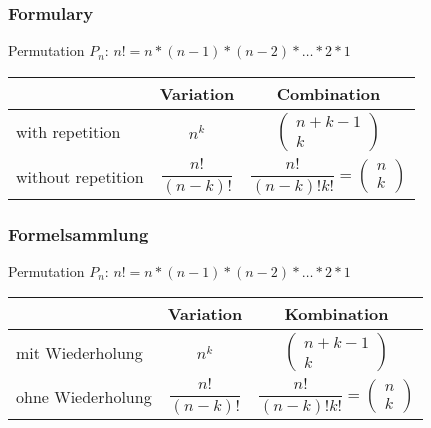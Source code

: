 \documentclass[xcolor=dvipsnames,11pt]{beamer}   %
\begin{document}
\begin{frame}
\frametitle{Formulary}
		Permutation $P_n$: $n! = n*(n-1)*(n-2)*\ldots*2*1$
\vspace*{0.3cm} 

\begin{tabular}{|l||c|c|} \hline
										  & Variation 				   & Combination \\
											\hline\hline
	with repetition     & $n^k$                & $\left(\begin{matrix} n+k-1 \\ k \end{matrix}\right)$ \\ \hline	
	without  repetition & $\dfrac{n!}{(n-k)!}$ & $\dfrac{n!}{(n-k)!k!}=\left(\begin{matrix} n \\ k \end{matrix}\right)$ \\ \hline
\end{tabular}
\end{frame} 

\begin{frame}
\frametitle{Formelsammlung}
		Permutation $P_n$: $n! = n*(n-1)*(n-2)*\ldots*2*1$
\vspace*{0.3cm} 

\begin{tabular}{|l||c|c|} \hline
										& Variation 				   & Kombination \\
										\hline\hline
	mit Wiederholung  & $n^k$                & $\left(\begin{matrix} n+k-1 \\ k \end{matrix}\right)$ \\ \hline	
	ohne Wiederholung & $\dfrac{n!}{(n-k)!}$ & $\dfrac{n!}{(n-k)!k!}=\left(\begin{matrix} n \\ k \end{matrix}\right)$ \\ \hline
\end{tabular}
\end{frame} 
\end{document}
